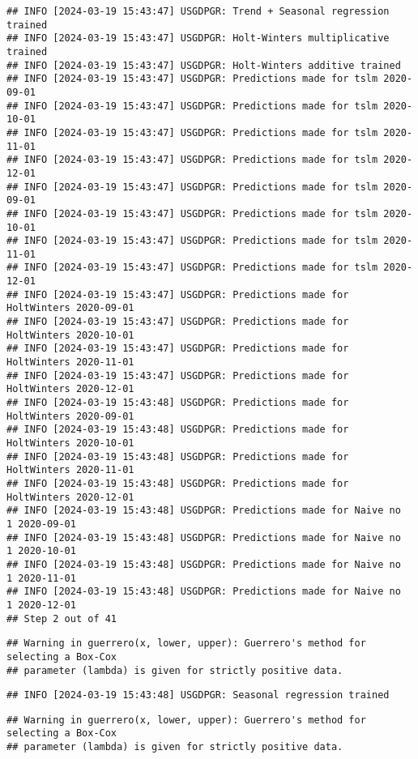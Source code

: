 \documentclass[
]{article}
\begin{document}
\begin{verbatim}
## INFO [2024-03-19 15:43:47] USGDPGR: Trend + Seasonal regression trained
## INFO [2024-03-19 15:43:47] USGDPGR: Holt-Winters multiplicative trained
## INFO [2024-03-19 15:43:47] USGDPGR: Holt-Winters additive trained
## INFO [2024-03-19 15:43:47] USGDPGR: Predictions made for tslm 2020-09-01
## INFO [2024-03-19 15:43:47] USGDPGR: Predictions made for tslm 2020-10-01
## INFO [2024-03-19 15:43:47] USGDPGR: Predictions made for tslm 2020-11-01
## INFO [2024-03-19 15:43:47] USGDPGR: Predictions made for tslm 2020-12-01
## INFO [2024-03-19 15:43:47] USGDPGR: Predictions made for tslm 2020-09-01
## INFO [2024-03-19 15:43:47] USGDPGR: Predictions made for tslm 2020-10-01
## INFO [2024-03-19 15:43:47] USGDPGR: Predictions made for tslm 2020-11-01
## INFO [2024-03-19 15:43:47] USGDPGR: Predictions made for tslm 2020-12-01
## INFO [2024-03-19 15:43:47] USGDPGR: Predictions made for HoltWinters 2020-09-01
## INFO [2024-03-19 15:43:47] USGDPGR: Predictions made for HoltWinters 2020-10-01
## INFO [2024-03-19 15:43:47] USGDPGR: Predictions made for HoltWinters 2020-11-01
## INFO [2024-03-19 15:43:47] USGDPGR: Predictions made for HoltWinters 2020-12-01
## INFO [2024-03-19 15:43:48] USGDPGR: Predictions made for HoltWinters 2020-09-01
## INFO [2024-03-19 15:43:48] USGDPGR: Predictions made for HoltWinters 2020-10-01
## INFO [2024-03-19 15:43:48] USGDPGR: Predictions made for HoltWinters 2020-11-01
## INFO [2024-03-19 15:43:48] USGDPGR: Predictions made for HoltWinters 2020-12-01
## INFO [2024-03-19 15:43:48] USGDPGR: Predictions made for Naive no  1 2020-09-01
## INFO [2024-03-19 15:43:48] USGDPGR: Predictions made for Naive no  1 2020-10-01
## INFO [2024-03-19 15:43:48] USGDPGR: Predictions made for Naive no  1 2020-11-01
## INFO [2024-03-19 15:43:48] USGDPGR: Predictions made for Naive no  1 2020-12-01
## Step 2 out of 41
\end{verbatim}

\begin{verbatim}
## Warning in guerrero(x, lower, upper): Guerrero's method for selecting a Box-Cox
## parameter (lambda) is given for strictly positive data.
\end{verbatim}

\begin{verbatim}
## INFO [2024-03-19 15:43:48] USGDPGR: Seasonal regression trained
\end{verbatim}

\begin{verbatim}
## Warning in guerrero(x, lower, upper): Guerrero's method for selecting a Box-Cox
## parameter (lambda) is given for strictly positive data.
\end{verbatim}
\end{document}
